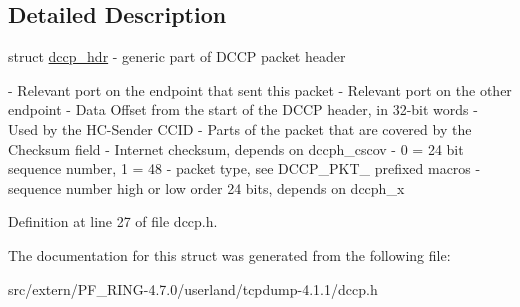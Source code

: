 \subsection{Detailed Description}
struct \hyperlink{structdccp__hdr}{dccp\_\-hdr} -\/ generic part of DCCP packet header

-\/ Relevant port on the endpoint that sent this packet  -\/ Relevant port on the other endpoint  -\/ Data Offset from the start of the DCCP header, in 32-\/bit words  -\/ Used by the HC-\/Sender CCID  -\/ Parts of the packet that are covered by the Checksum field  -\/ Internet checksum, depends on dccph\_\-cscov  -\/ 0 = 24 bit sequence number, 1 = 48  -\/ packet type, see DCCP\_\-PKT\_\- prefixed macros  -\/ sequence number high or low order 24 bits, depends on dccph\_\-x 

Definition at line 27 of file dccp.h.



The documentation for this struct was generated from the following file:\begin{DoxyCompactItemize}
\item 
src/extern/PF\_\-RING-\/4.7.0/userland/tcpdump-\/4.1.1/dccp.h\end{DoxyCompactItemize}
